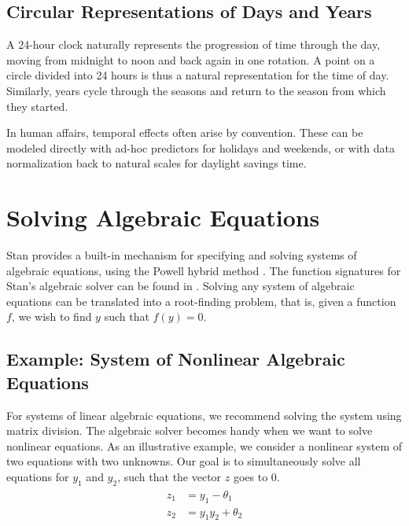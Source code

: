 \section{Circular Representations of Days and Years}

A 24-hour clock naturally represents the progression of time through
the day, moving from midnight to noon and back again in one rotation.
A point on a circle divided into 24 hours is thus a natural
representation for the time of day.  Similarly, years cycle through
the seasons and return to the season from which they started.

In human affairs, temporal effects often arise by convention.  These
can be modeled directly with ad-hoc predictors for holidays and
weekends, or with data normalization back to natural scales for
daylight savings time.

\chapter{Solving Algebraic Equations}\label{algebra-solver.chapter}

\noindent
Stan provides a built-in mechanism for specifying and solving systems
of algebraic equations, using the Powell hybrid method \citep{Powell:1970}.
The function signatures for Stan's algebraic solver can be found in
.
%
Solving any system of algebraic equations can be translated into a root-finding
problem, that is, given a function $f$, we wish to find $y$ such that
$f(y) = 0$.

\section{Example: System of Nonlinear Algebraic Equations}

For systems of linear algebraic equations, we recommend solving the system
using matrix division. The algebraic solver becomes handy when we want
to solve nonlinear equations.
%
As an illustrative example, we consider a nonlinear system of two equations
with two unknowns. Our goal is to simultaneously solve all equations for
$y_1$ and $y_2$, such that the vector $z$ goes to 0.
%
\begin{eqnarray}\label{algebra.equation}
  \begin{aligned}
  z_1 &= y_1 - \theta_1 \\
  z_2 &= y_1 y_2 + \theta_2 \\
  \end{aligned}
\end{eqnarray}
%

